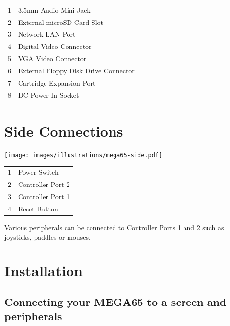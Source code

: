\begin{center}
\begin{longtable}{ c | l}
	1	& 	3.5mm Audio Mini-Jack \\
	2	& 	External microSD Card Slot\\
	3	& 	Network LAN Port \\
	4	& 	Digital Video Connector \\
	5	& 	VGA Video Connector \\
	6	& 	External Floppy Disk Drive Connector \\
	7	& 	Cartridge Expansion Port \\
	8	& 	DC Power-In Socket \\
\end{longtable}
\end{center}

\vspace{-1cm}

\section{Side Connections}

\texttt{[image: images/illustrations/mega65-side.pdf]}

\begin{center}
\begin{longtable}{ c | l}
	1	& 	Power Switch \\
	2	& 	Controller Port 2 \\
	3	& 	Controller Port 1 \\
	4	& 	Reset Button \\
\end{longtable}
\end{center}
Various peripherals can be connected to Controller Ports 1 and 2 such as
joysticks, paddles or mouses.

\newpage

\section{Installation}

\subsection{Connecting your MEGA65 to a screen and peripherals}

